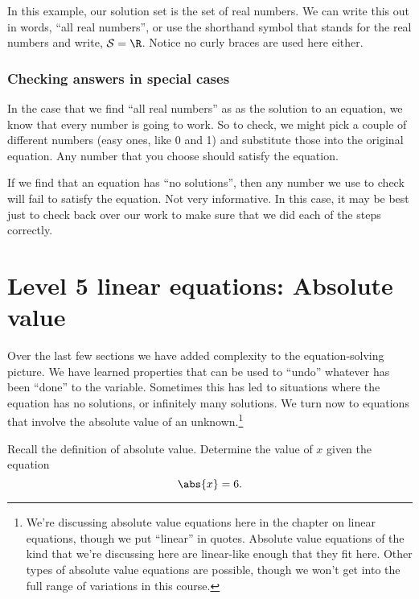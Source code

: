 In this example, our solution set is the set of real numbers. We can write this out in words, ``all real numbers'', or use the shorthand symbol that stands for the real numbers and write, $\mathcal{S} = \R$. Notice no curly braces are used here either.

\subsubsection{Checking answers in special cases}

In the case that we find ``all real numbers'' as as the solution to an equation, we know that every number is going to work. So to check, we might pick a couple of different numbers (easy ones, like 0 and 1) and substitute those into the original equation. Any number that you choose should satisfy the equation.

If we find that an equation has ``no solutions'', then any number we use to check will fail to satisfy the equation. Not very informative. In this case, it may be best just to check back over our work to make sure that we did each of the steps correctly.

\section{Level 5 linear equations: Absolute value}
\label{sec:linearlevel5}

Over the last few sections we have added complexity to the equation-solving picture. We have learned properties that can be used to ``undo'' whatever has been ``done'' to the variable. Sometimes this has led to situations where the equation has no solutions, or infinitely many solutions. We turn now to equations that involve the absolute value of an unknown.\footnote{We're discussing absolute value equations here in the chapter on linear equations, though we put ``linear'' in quotes. Absolute value equations of the kind that we're discussing here are linear-like enough that they fit here. Other types of absolute value equations are possible, though we won't get into the full range of variations in this course.}

\begin{boxedexplore}
\end{boxedexplore}

\begin{boxedexplore}
Recall the definition of absolute value. Determine the value of $x$ given the equation \[\abs{x} = 6.\]
\end{boxedexplore} %

